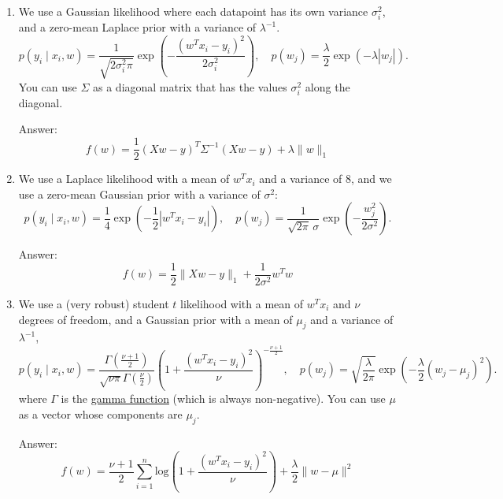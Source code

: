 \documentclass{article}
\newenvironment{answer}{\par\begingroup\color{gre}Answer: }{\endgroup}
\newcommand{\norm}[1]{\lVert #1 \rVert}
\begin{document}
\begin{enumerate}

\item We use a Gaussian likelihood where each datapoint has its own variance $\sigma_i^2$, and a zero-mean Laplace prior with a variance of $\lambda^{-1}$.
\[
p(y_i \mid x_i,w) = \frac{1}{\sqrt{2\sigma_i^2\pi}}\exp\left(-\frac{(w^Tx_i - y_i)^2}{2\sigma_i^2}\right), \quad p(w_j) = \frac{\lambda}{2}\exp(-\lambda|w_j|).
\]
You can use $\Sigma$ as a diagonal matrix that has the values $\sigma_i^2$ along the diagonal.

\begin{answer}
	\begin{equation*}
		f(w) = \frac{1}{2}(Xw - y)^T \Sigma^{-1} (Xw - y) + \lambda \norm{w}_1
	\end{equation*} 
\end{answer}

\item We use a Laplace likelihood with a mean of $w^Tx_i$ and a variance of $8$, and we use a zero-mean Gaussian prior with a variance of $\sigma^2$:
\[
p(y_i \mid x_i, w) = \frac14 \exp\left(- \frac12 |w^Tx_i - y_i| \right), \quad
p(w_j) = \frac{1}{\sqrt{2\pi} \, \sigma} \exp\left(-\frac{w_j^2}{2\sigma^2} \right).
\]

\begin{answer}
	\begin{equation*}
		f(w) = \frac{1}{2} \norm{Xw - y}_1 + \frac{1}{2 \sigma ^2} w^T w
	\end{equation*}
\end{answer}

 \item We use a (very robust) student $t$ likelihood with a mean of $w^Tx_i$ and $\nu$ degrees of freedom, and a Gaussian prior with a mean of $\mu_j$ and a variance of $\lambda^{-1}$,
\[
  p(y_i \mid x_i, w) = \frac{\Gamma\left(\frac{\nu + 1}{2}\right)}{\sqrt{\nu\pi}\Gamma\left(\frac \nu 2\right)}
                       \left(1 + \frac{(w^T x_i - y_i)^2}{\nu} \right)^{-\frac{\nu+1}{2}}
, \quad
  p(w_j) = \sqrt{\frac{\lambda}{2\pi}} \exp\left( -\frac\lambda2 (w_j - \mu_j)^2 \right).
\]
where $\Gamma$ is the \href{https://en.wikipedia.org/wiki/Gamma_function}{gamma function} (which is always non-negative).
You can use $\mu$ as a vector whose components are $\mu_j$.
\begin{answer}
	\begin{equation*}
		f(w) = \frac{\nu + 1}{2} \sum_{i = 1}^n \text{log} \left(1 + \frac{(w^T x_i - y_i)^2}{\nu}\right) + \frac{\lambda}{2} \norm{w - \mu}^2
	\end{equation*}
\end{answer}


\end{enumerate}
\end{document}

